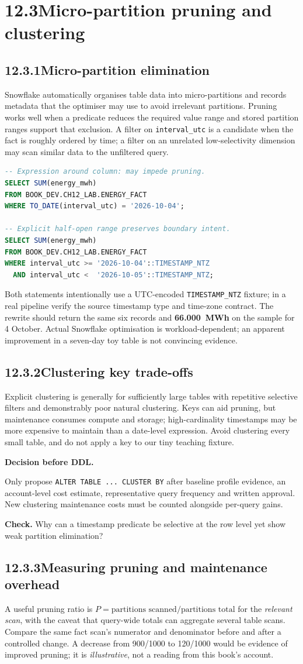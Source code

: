 \documentclass[11pt,twoside]{article}
\newcommand{\topic}[2]{\subsection*{#1\quad #2}}
\begin{document}
\section*{12.3\quad Micro-partition pruning and clustering}
\topic{12.3.1}{Micro-partition elimination}
Snowflake automatically organises table data into micro-partitions and records metadata that the optimiser may use to avoid irrelevant partitions. Pruning works well when a predicate reduces the required value range and stored partition ranges support that exclusion. A filter on \texttt{interval\_utc} is a candidate when the fact is roughly ordered by time; a filter on an unrelated low-selectivity dimension may scan similar data to the unfiltered query.
\begin{lstlisting}[language=SQL,caption={Same intended UTC interval; inspect plans, not timings alone.}]
-- Expression around column: may impede pruning.
SELECT SUM(energy_mwh)
FROM BOOK_DEV.CH12_LAB.ENERGY_FACT
WHERE TO_DATE(interval_utc) = '2026-10-04';

-- Explicit half-open range preserves boundary intent.
SELECT SUM(energy_mwh)
FROM BOOK_DEV.CH12_LAB.ENERGY_FACT
WHERE interval_utc >= '2026-10-04'::TIMESTAMP_NTZ
  AND interval_utc <  '2026-10-05'::TIMESTAMP_NTZ;
\end{lstlisting}
Both statements intentionally use a UTC-encoded \texttt{TIMESTAMP\_NTZ} fixture; in a real pipeline verify the source timestamp type and time-zone contract. The rewrite should return the same six records and \textbf{66.000~MWh} on the sample for 4 October. Actual Snowflake optimisation is workload-dependent; an apparent improvement in a seven-day toy table is not convincing evidence.
\topic{12.3.2}{Clustering key trade-offs}
Explicit clustering is generally for sufficiently large tables with repetitive selective filters and demonstrably poor natural clustering. Keys can aid pruning, but maintenance consumes compute and storage; high-cardinality timestamps may be more expensive to maintain than a date-level expression. Avoid clustering every small table, and do not apply a key to our tiny teaching fixture.
\begin{insight}\textbf{Decision before DDL.}\par
Only propose \texttt{ALTER TABLE ... CLUSTER BY} after baseline profile evidence, an account-level cost estimate, representative query frequency and written approval. New clustering maintenance costs must be counted alongside per-query gains.\end{insight}
\textbf{Check.} Why can a timestamp predicate be selective at the row level yet show weak partition elimination?
\newpage
\topic{12.3.3}{Measuring pruning and maintenance overhead}
A useful pruning ratio is $P=\text{partitions scanned}/\text{partitions total}$ for the \emph{relevant scan}, with the caveat that query-wide totals can aggregate several table scans. Compare the same fact scan's numerator and denominator before and after a controlled change. A decrease from 900/1000 to 120/1000 would be evidence of improved pruning; it is \emph{illustrative}, not a reading from this book's account.
\end{document}
